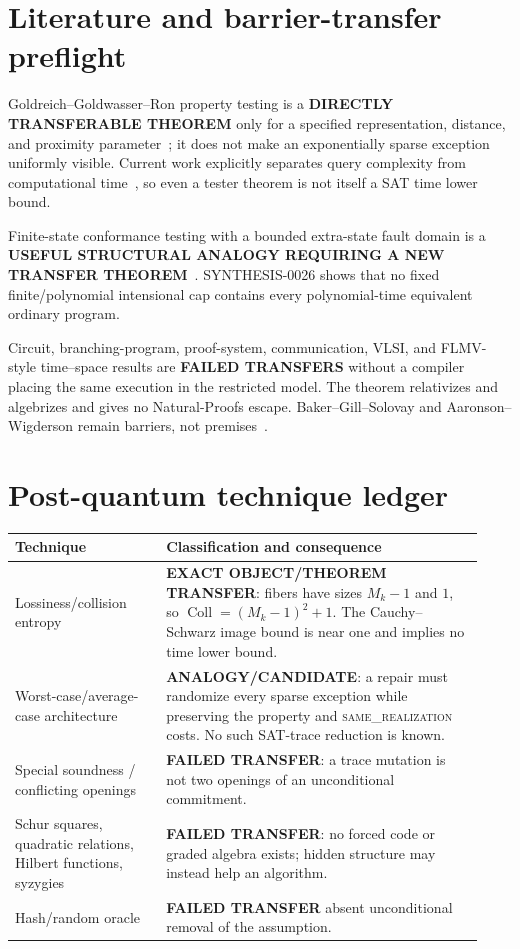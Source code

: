 \documentclass[11pt]{article}
\newcommand{\same}{\textsc{same\_realization}}
\begin{document}
\section{Literature and barrier-transfer preflight}
Goldreich--Goldwasser--Ron property testing is a
\textbf{DIRECTLY TRANSFERABLE THEOREM} only for a specified representation,
distance, and proximity parameter~\cite{GGR98}; it does not make an
exponentially sparse exception uniformly visible. Current work explicitly
separates query complexity from computational time~\cite{GGR25}, so even a
tester theorem is not itself a SAT time lower bound.

Finite-state conformance testing with a bounded extra-state fault domain is a
\textbf{USEFUL STRUCTURAL ANALOGY REQUIRING A NEW TRANSFER THEOREM}~\cite{VAB24}.
SYNTHESIS-0026 shows that no fixed finite/polynomial intensional cap contains
every polynomial-time equivalent ordinary program.

Circuit, branching-program, proof-system, communication, VLSI, and FLMV-style
time--space results are \textbf{FAILED TRANSFERS} without a compiler placing
the same execution in the restricted model. The theorem relativizes and
algebrizes and gives no Natural-Proofs escape. Baker--Gill--Solovay and
Aaronson--Wigderson remain barriers, not premises~\cite{BGS75,AW09}.

\section{Post-quantum technique ledger}
\begin{longtable}{p{0.30\linewidth}p{0.63\linewidth}}
\toprule Technique & Classification and consequence\\ \midrule\endhead
Lossiness/collision entropy & \textbf{EXACT OBJECT/THEOREM TRANSFER}: fibers
have sizes \(M_k-1\) and \(1\), so
\(\operatorname{Coll}=(M_k-1)^2+1\). The Cauchy--Schwarz image bound is near
one and implies no time lower bound.\\
Worst-case/average-case architecture & \textbf{ANALOGY/CANDIDATE}: a repair
must randomize every sparse exception while preserving the property and
\same{} costs. No such SAT-trace reduction is known.\\
Special soundness / conflicting openings & \textbf{FAILED TRANSFER}: a trace
mutation is not two openings of an unconditional commitment.\\
Schur squares, quadratic relations, Hilbert functions, syzygies &
\textbf{FAILED TRANSFER}: no forced code or graded algebra exists; hidden
structure may instead help an algorithm.\\
Hash/random oracle & \textbf{FAILED TRANSFER} absent unconditional removal of
the assumption.\\ \bottomrule
\end{longtable}
\end{document}
